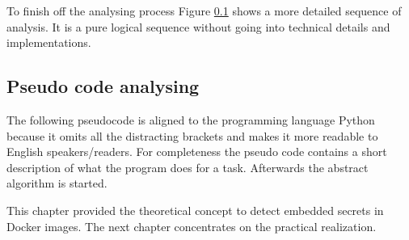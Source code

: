 To finish off the analysing process Figure \ref{ch:theory:analysing_pseudocode} shows a more detailed sequence of analysis.
It is a pure logical sequence without going into technical details and implementations. 

\subsection{Pseudo code analysing}
\label{ch:theory:analysing_pseudocode}
The following pseudocode is aligned to the programming language Python because it omits all the distracting brackets and makes it more readable to English speakers/readers.
For completeness the pseudo code contains a short description of what the program does for a task. Afterwards the abstract algorithm is started.

This chapter provided the theoretical concept to detect embedded secrets in Docker images. The next chapter concentrates on the practical realization.
